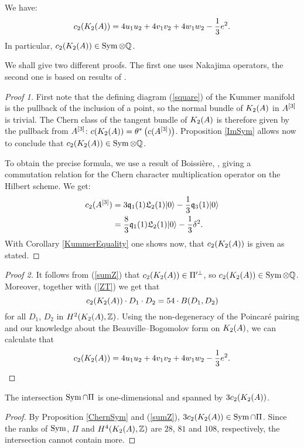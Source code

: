 \begin{proposition} \label{ChernSym}
We have:
\begin{equation}
c_2(K_{ 2 }( A ))= 4 u_1u_2 + 4v_1v_2 + 4 w_1 w_2 - \frac{1}{3} e^2. 
\end{equation}
In particular, $c_2(K_{ 2 }( A ))\in \operatorname{Sym} \otimes\mathbb{Q} $.
\end{proposition}
We shall give two different proofs. The first one uses Nakajima operators, the second one is based on results of \cite{Hassett}.
\begin{proof}[Proof 1]
First note that the defining diagram (\ref{square}) of the Kummer manifold is the pullback of the inclusion of a point, so the normal bundle of $K_{ 2 }( A )$ in $A^{[3]}$ is trivial. The Chern class of the tangent bundle of $K_{ 2 }( A )$ is therefore given by the pullback from $A^{[3]}$: $c(K_{ 2 }( A )) = \theta^*\left(c(A^{[3]})\right)$. Proposition \ref{ImSym} allows now to conclude that $c_2(K_{ 2 }( A ))\in \operatorname{Sym} \otimes \mathbb{Q}$.

To obtain the precise formula, we use a result of Boissi\`ere, \cite[Lemma 3.12]{Boissiere}, giving a commutation relation for the Chern character multiplication operator on the Hilbert scheme. We get:
\begin{align*}
c_2(A^{[3]}) & = 3\mathfrak{q}_1(1)\mathfrak L_2(1)|0\rangle - \frac{1}{3} \mathfrak{q}_3(1)|0\rangle \\
 & =\frac{8}{3}\mathfrak{q}_1(1)\mathfrak L_2(1)|0\rangle - \frac{1}{3} \delta^2 .
\end{align*}
With Corollary \ref{KummerEquality} one shows now, that $c_2(K_{ 2 }( A ))$ is given as stated.
\end{proof}
\begin{proof}[Proof 2]
It follows from (\ref{sumZ}) that $c_2(K_{ 2 }( A ))\in \Pi'^\perp$, so $c_2(K_{ 2 }( A )) \in \operatorname{Sym}\otimes\mathbb{Q}$. Moreover, together with (\ref{ZT}) we get that
\begin{equation*}
c_2(K_{ 2 }( A ))\cdot D_{1}\cdot D_{2}=54\cdot B(D_{1},D_{2})
\end{equation*}
for all $D_{1}$, $D_{2}$ in $H^{2}(K_{ 2 }( A ),\mathbb{Z})$. Using the non-degeneracy of the Poincar\'e pairing and our knowledge about the Beauville--Bogomolov form on $K_{ 2 }( A )$, we can calculate that
\[
c_2(K_{ 2 }( A ))= 4 u_1u_2 + 4v_1v_2 + 4 w_1 w_2 - \frac{1}{3} e^2.  \qedhere
\]
\end{proof}


\begin{corollary}\label{Pi'}
The intersection $\operatorname{Sym}\cap \Pi$ is one-dimensional and spanned by $3c_2(K_{ 2 }( A ))$. 
\end{corollary}
\begin{proof}
By Proposition \ref{ChernSym} and (\ref{sumZ}), $3c_2(K_{ 2 }( A ))\in \operatorname{Sym}\cap \Pi$. Since the ranks of $\operatorname{Sym}$, $\Pi$ and $H^4(K_{ 2 }( A ),\mathbb{Z})$ are $28$, $81$ and $108$, respectively, the intersection cannot contain more.
\end{proof}

